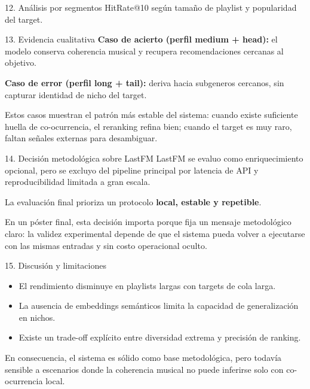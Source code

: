 \documentclass[final]{beamer}
\newlength{\colwidth}
\begin{document}
\begin{frame}[t]
\begin{columns}[t]
\begin{column}{\colwidth}
\begin{block}{12. Análisis por segmentos}
\vspace{0.08cm}
\small HitRate@10 según tamaño de playlist y popularidad del target.
\end{block}

\begin{block}{13. Evidencia cualitativa}
\textbf{Caso de acierto (perfil medium + head):} el modelo conserva coherencia musical y recupera recomendaciones cercanas al objetivo.

\vspace{0.18cm}
\textbf{Caso de error (perfil long + tail):} deriva hacia subgeneros cercanos, sin capturar identidad de nicho del target.

\vspace{0.18cm}
Estos casos muestran el patrón más estable del sistema: cuando existe suficiente huella de co-ocurrencia, el reranking refina bien; cuando el target es muy raro, faltan señales externas para desambiguar.
\end{block}

\begin{alertblock}{14. Decisión metodológica sobre LastFM}
LastFM se evaluo como enriquecimiento opcional, pero se excluyo del pipeline principal por latencia de API y reproducibilidad limitada a gran escala.

La evaluación final prioriza un protocolo \textbf{local, estable y repetible}.

En un póster final, esta decisión importa porque fija un mensaje metodológico claro: la validez experimental depende de que el sistema pueda volver a ejecutarse con las mismas entradas y sin costo operacional oculto.
\end{alertblock}

\begin{block}{15. Discusión y limitaciones}
\begin{itemize}
  \item El rendimiento disminuye en playlists largas con targets de cola larga.
  \item La ausencia de embeddings semánticos limita la capacidad de generalización en nichos.
  \item Existe un trade-off explícito entre diversidad extrema y precisión de ranking.
\end{itemize}

\vspace{0.04cm}
En consecuencia, el sistema es sólido como base metodológica, pero todavía sensible a escenarios donde la coherencia musical no puede inferirse solo con co-ocurrencia local.
\end{block}


\end{column}
\end{columns}
\end{frame}
\end{document}
